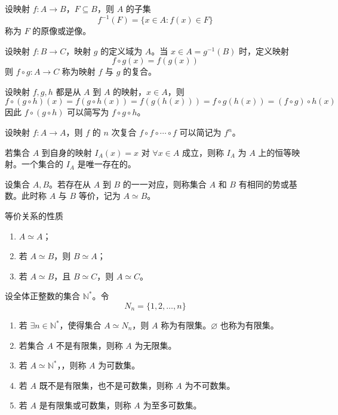 \begin{definition}
    设映射 $f : A \to B$，$F \subseteq B$，则 $A$ 的子集
    \[f^{-1}(F) = \{ x \in A: f(x) \in F \}\]
    称为 $F$ 的原像或逆像。
\end{definition}

\begin{definition}
    设映射 $f : B \to C$，映射 $g$ 的定义域为 $A$。当 $x \in A = g^{-1}(B)$ 时，定义映射
    \[f \circ g(x) = f(g(x))\]
    则 $f \circ g: A \to C$ 称为映射 $f$ 与 $g$ 的复合。
\end{definition}

\begin{proposition}
    设映射 $f, g, h$ 都是从 $A$ 到 $A$ 的映射，$x \in A$，则
    \[f \circ (g \circ h)(x) = f(g \circ h(x)) = f(g(h(x))) = f \circ g(h(x)) = (f \circ g) \circ h(x)\]
    因此 $f \circ (g \circ h)$ 可以简写为 $f \circ g \circ h$。
\end{proposition}

\begin{definition}
    设映射 $f: A \to A$，则 $f$ 的 $n$ 次复合 $f \circ f \circ \cdots \circ f$ 可以简记为 $f^{n}$。
\end{definition}

\begin{definition}
    若集合 $A$ 到自身的映射 $I_A(x) = x$ 对 $\forall x \in A$ 成立，则称 $I_A$ 为 $A$ 上的恒等映射。一个集合的 $I_A$ 是唯一存在的。
\end{definition}

\begin{definition}
    设集合 $A, B$。若存在从 $A$ 到 $B$ 的一一对应，则称集合 $A$ 和 $B$ 有相同的势或基数。此时称 $A$ 与 $B$ 等价，记为 $A \simeq B$。
\end{definition}

\begin{proposition}
    等价关系的性质
    \begin{enumerate}
        \item $A \simeq A$；
        \item 若 $A \simeq B$，则 $B \simeq A$；
        \item 若 $A \simeq B$，且 $B \simeq C$，则 $A \simeq C$。
    \end{enumerate}
\end{proposition}

\begin{definition}
    设全体正整数的集合 $\mathbb{N}^{*}$。令
    \[N_n = \{ 1,2, \ldots ,n \}\]
    \begin{enumerate}
        \item 若 $\exists n \in \mathbb{N}^{*}$，使得集合 $A \simeq N_n$，则 $A$ 称为有限集。$\varnothing$ 也称为有限集。
        \item 若集合 $A$ 不是有限集，则称 $A$ 为无限集。
        \item 若 $A \simeq \mathbb{N}^{*}$，，则称 $A$ 为可数集。
        \item 若 $A$ 既不是有限集，也不是可数集，则称 $A$ 为不可数集。
        \item 若 $A$ 是有限集或可数集，则称 $A$ 为至多可数集。
    \end{enumerate}
\end{definition}

